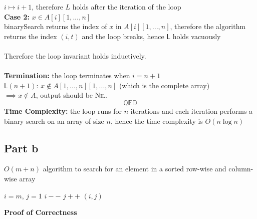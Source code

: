 \documentclass[12pt]{article}
\begin{document}
    $i \mapsto i+1$, therefore $L$ holds after the iteration of the loop\\
\textbf{Case 2:} $x \in A[i][1,...,n]$\\
binarySearch returns the index of $x$ in $A[i][1,...,n]$, therefore the algorithm returns the index $(i, t)$ and the loop breaks, hence $\mathsf{L}$ holds vacuously\\
\\
Therefore the loop invariant holds inductively.\\
\\
\textbf{Termination:} the loop terminates when $i = n+1$\\
$\mathsf{L}(n+1)$: $x \notin A[1,...,n][1,...,n]$ (which is the complete array)\\
$\implies x \notin A$, output should be \textsc{Nil}.
$$\mathbb{Q} \mathbb{E} \mathbb{D} $$
\textbf{Time Complexity:} the loop runs for $n$ iterations and each iteration performs a binary search on an array of size $n$, hence the time complexity is $O(n \log n)$\\
\subsection*{Part b}
\begin{algorithm}[H]
    \caption{$O(m + n)$ algorithm to search for an element in a sorted row-wise and column-wise array}
\begin{algorithmic}[1]
    $i = m$, $j = 1$\;
            \State $i--$\;
            \State $j++$\;
        \Else
            \State \Return $(i, j)$\;
        \EndIf
    \EndWhile
\end{algorithmic}
\end{algorithm}
\textbf{Proof of Correctness}
\end{document}
